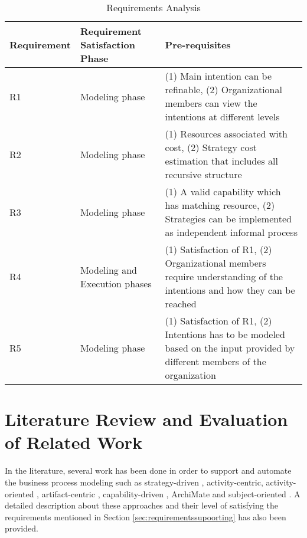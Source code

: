 \begin{table} [htbp]
	\centering
	\begin{tabular} {p{2.5cm}p{3cm}p{8cm}}
		\toprule
		\textbf{Requirement} & \textbf{Requirement Satisfaction Phase} & \textbf{Pre-requisites}    \\
		\midrule                                                                                                               
		R1    & Modeling phase    &(1) Main intention can be refinable, (2) Organizational members can view the intentions at different levels    \\ 
		
		R2   & Modeling phase    &(1) Resources associated with cost, (2) Strategy cost estimation that includes all recursive structure \\         
			
		R3   & Modeling phase       &(1) A valid capability which has matching resource, (2) Strategies can be implemented as independent informal process \\      
		
		R4   & Modeling and Execution phases     &(1) Satisfaction of R1, (2) Organizational members require understanding of the intentions and how they can be reached \\                         
			
		R5  &Modeling phase  &(1) Satisfaction of R1, (2) Intentions has to be modeled based on the input provided by different members of the organization               \\ 
		    
		\bottomrule
	\end{tabular}
	\caption{Requirements Analysis}
	\label{tab:subrequirements}
\end{table}

\section{Literature Review and Evaluation of Related Work}
\label{sec:literaturereview}
In the literature, several work has been done in order to support and automate the business process modeling such as strategy-driven \cite{Bider2005}, activity-centric\cite{Yarosh2009}, activity-oriented \cite{Leymann2000}, artifact-centric \cite{Cohn2009}, capability-driven \cite{Stirna2012}, ArchiMate \cite{Group2012} and subject-oriented \cite{Fleischmann2013}.  A detailed description about these approaches and their level of satisfying the requirements mentioned in Section \ref{sec:requirementssupoorting} has also been provided. 

